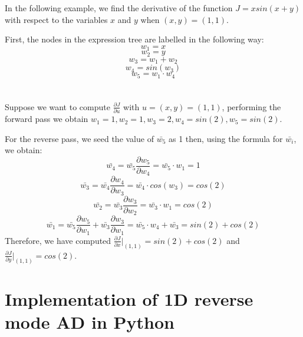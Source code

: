 \documentclass{article}
\begin{document}
In the following example, we find the derivative of the function $J = xsin(x+y)$ with respect to the variables $x$ and $y$ when $(x, y) = (1, 1)$.

First, the nodes in the expression tree are labelled in the following way:
\begin{equation}
w_1 = x
\end{equation}
\begin{equation}
w_2 = y
\end{equation}
\begin{equation}
w_3 = w_1 + w_2
\end{equation}
\begin{equation}
w_4 = sin(w_3)
\end{equation}
\begin{equation}
w_5 = w_1 \cdot w_4
\end{equation}
\\\\

Suppose we want to compute $\frac{\partial{J}}{\partial{u}}$ with $u = (x, y) = (1, 1)$, performing the forward pass we obtain $w_1 = 1, w_2 = 1, w_3 = 2, w_4 = sin(2), w_5 = sin(2)$.

For the reverse pass, we seed the value of $\bar{w_5}$ as 1 then, using the formula for $\bar{w_i}$, we obtain:
\begin{equation}
\bar{w_4} = \bar{w_5}\frac{\partial{w_5}}{\partial{w_4}} = \bar{w_5}\cdot w_1 = 1
\end{equation}
\begin{equation}
\bar{w_3} = \bar{w_4}\frac{\partial{w_4}}{\partial{w_3}} = \bar{w_4}\cdot cos(w_3) = cos(2)
\end{equation}
\begin{equation}
\bar{w_2} = \bar{w_3}\frac{\partial{w_3}}{\partial{w_2}} = \bar{w_3}\cdot w_1 = cos(2)
\end{equation}
\begin{equation}
\bar{w_1} = \bar{w_5}\frac{\partial{w_5}}{\partial{w_1}} + \bar{w_3}\frac{\partial{w_3}}{\partial{w_1}} = \bar{w_5}\cdot w_4 + \bar{w_3} = sin(2) + cos(2)
\end{equation}
Therefore, we have computed $\frac{\partial{J}}{\partial{x}}\vert_{(1, 1)} = sin(2) + cos(2)$ and $\frac{\partial{J}}{\partial{y}}\vert_{(1, 1)} = cos(2)$.

\section{Implementation of 1D reverse mode AD in Python}
\end{document}
